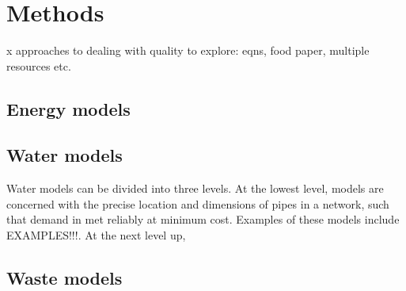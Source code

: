 \section{Methods}
\label{sec:methods}

x approaches to dealing with quality to explore: eqns, food paper, multiple resources etc.

\subsection{Energy models}
 
\subsection{Water models}
Water models can be divided into three levels. At the lowest level, models are concerned with the precise location and dimensions of pipes in a network, such that demand in met reliably at minimum cost. Examples of these models include EXAMPLES!!!.  At the next level up, 
 
\subsection{Waste models}


